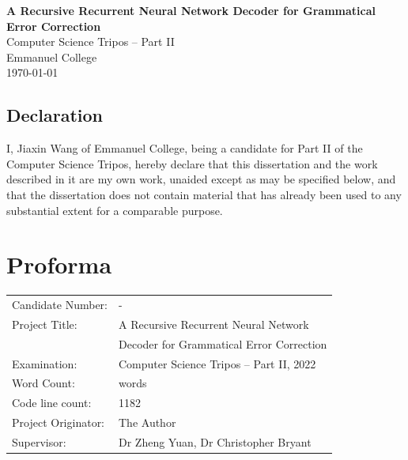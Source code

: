 \documentclass[12pt,a4paper,twoside,openright]{report}
\newcommand{\quickwordcount}[1]{%
  \immediate\write18{texcount -1 -sum -merge -q #1.tex output.bbl > #1-words.sum }%
   words%
}
\begin{document}




\pagestyle{empty}


\vspace*{60mm}
\begin{center}
\Huge
\textbf{A Recursive Recurrent Neural Network Decoder for Grammatical Error Correction} \\[5mm]
Computer Science Tripos -- Part II \\[5mm]
Emmanuel College \\[5mm]
\today  %
\end{center}
\thispagestyle{empty}

\pagestyle{plain}
\newpage

\section*{Declaration}

I, Jiaxin Wang of Emmanuel College, being a candidate for Part II of the Computer
Science Tripos, hereby declare that this dissertation and the work described in 
it are my own work, unaided except as may be specified below, and that the dissertation
does not contain material that has already been used to any substantial
extent for a comparable purpose.

\bigskip
{}

\medskip
{}

\chapter*{Proforma}

{\large
\begin{tabular}{ll}
Candidate Number:   & -                       \\
Project Title:      & A Recursive Recurrent Neural Network \\
 & Decoder for Grammatical Error Correction \\
Examination:        & Computer Science Tripos -- Part II, 2022  \\
Word Count:         & \quickwordcount{diss}\footnotemark[1] \\
Code line count:    & 1182 \footnotemark[2]\\
Project Originator: & The Author \\
Supervisor:         & Dr Zheng Yuan, Dr Christopher Bryant
\end{tabular}
}
\end{document}
